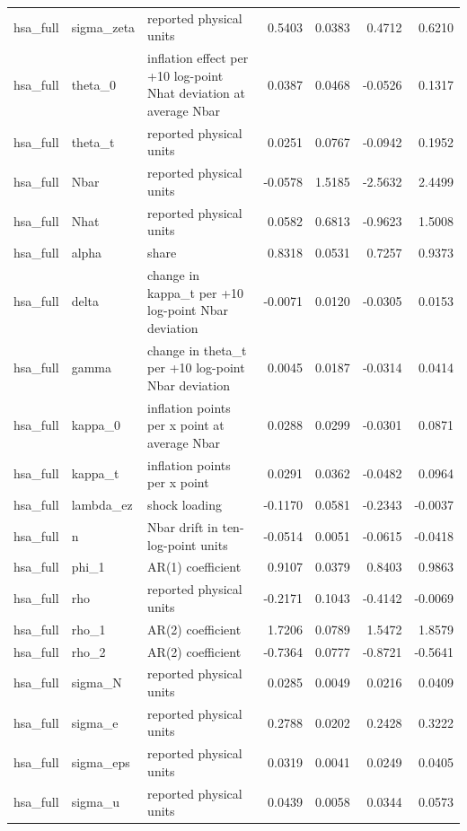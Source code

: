 \begin{tabular}{lllrrrr}
hsa\_full & sigma\_zeta & reported physical units & 0.5403 & 0.0383 & 0.4712 & 0.6210 \\
hsa\_full & theta\_0 & inflation effect per +10 log-point Nhat deviation at average Nbar & 0.0387 & 0.0468 & -0.0526 & 0.1317 \\
hsa\_full & theta\_t & reported physical units & 0.0251 & 0.0767 & -0.0942 & 0.1952 \\
hsa\_full & Nbar & reported physical units & -0.0578 & 1.5185 & -2.5632 & 2.4499 \\
hsa\_full & Nhat & reported physical units & 0.0582 & 0.6813 & -0.9623 & 1.5008 \\
hsa\_full & alpha & share & 0.8318 & 0.0531 & 0.7257 & 0.9373 \\
hsa\_full & delta & change in kappa\_t per +10 log-point Nbar deviation & -0.0071 & 0.0120 & -0.0305 & 0.0153 \\
hsa\_full & gamma & change in theta\_t per +10 log-point Nbar deviation & 0.0045 & 0.0187 & -0.0314 & 0.0414 \\
hsa\_full & kappa\_0 & inflation points per x point at average Nbar & 0.0288 & 0.0299 & -0.0301 & 0.0871 \\
hsa\_full & kappa\_t & inflation points per x point & 0.0291 & 0.0362 & -0.0482 & 0.0964 \\
hsa\_full & lambda\_ez & shock loading & -0.1170 & 0.0581 & -0.2343 & -0.0037 \\
hsa\_full & n & Nbar drift in ten-log-point units & -0.0514 & 0.0051 & -0.0615 & -0.0418 \\
hsa\_full & phi\_1 & AR(1) coefficient & 0.9107 & 0.0379 & 0.8403 & 0.9863 \\
hsa\_full & rho & reported physical units & -0.2171 & 0.1043 & -0.4142 & -0.0069 \\
hsa\_full & rho\_1 & AR(2) coefficient & 1.7206 & 0.0789 & 1.5472 & 1.8579 \\
hsa\_full & rho\_2 & AR(2) coefficient & -0.7364 & 0.0777 & -0.8721 & -0.5641 \\
hsa\_full & sigma\_N & reported physical units & 0.0285 & 0.0049 & 0.0216 & 0.0409 \\
hsa\_full & sigma\_e & reported physical units & 0.2788 & 0.0202 & 0.2428 & 0.3222 \\
hsa\_full & sigma\_eps & reported physical units & 0.0319 & 0.0041 & 0.0249 & 0.0405 \\
hsa\_full & sigma\_u & reported physical units & 0.0439 & 0.0058 & 0.0344 & 0.0573 \\

\end{tabular}
